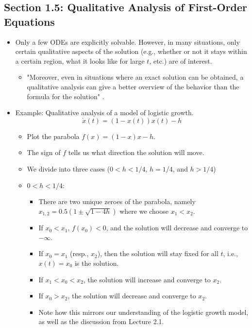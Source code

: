 \documentclass[../notes.tex]{subfiles}
\begin{document}
\subsection*{Section 1.5: Qualitative Analysis of First-Order Equations}
\begin{itemize}
    \item {}Only a few ODEs are explicitly solvable. However, in many situations, only certain qualitative aspects of the solution (e.g., whether or not it stays within a certain region, what it looks like for large $t$, etc.) are of interest.
    \begin{itemize}
        \item "Moreover, even in situations where an exact solution can be obtained, a qualitative analysis can give a better overview of the behavior than the formula for the solution" \parencite[20]{bib:Teschl}.
    \end{itemize}
    \item Example: Qualitative analysis of a model of logistic growth.
    \begin{equation*}
        \dot{x}(t) = (1-x(t))x(t)-h
    \end{equation*}
    \begin{itemize}
        \item Plot the parabola $f(x)=(1-x)x-h$.
        \item The sign of $f$ tells us what direction the solution will move.
        \item We divide into three cases ($0<h<1/4$, $h=1/4$, and $h>1/4$)
        \item $0<h<1/4$:
        \begin{itemize}
            \item There are two unique zeroes of the parabola, namely $x_{1,2}=0.5(1\pm\sqrt{1-4h})$ where we choose $x_1<x_2$.
            \item If $x_0<x_1$, $f(x_0)<0$, and the solution will decrease and converge to $-\infty$.
            \item If $x_0=x_1$ (resp., $x_2$), then the solution will stay fixed for all $t$, i.e., $x(t)=x_0$ is the solution.
            \item If $x_1<x_0<x_2$, the solution will increase and converge to $x_2$.
            \item If $x_0>x_2$, the solution will decrease and converge to $x_2$.
            \item Note how this mirrors our understanding of the logistic growth model, as well as the discussion from Lecture 2.1.

\end{itemize}
\end{itemize}
\end{itemize}
\end{document}
